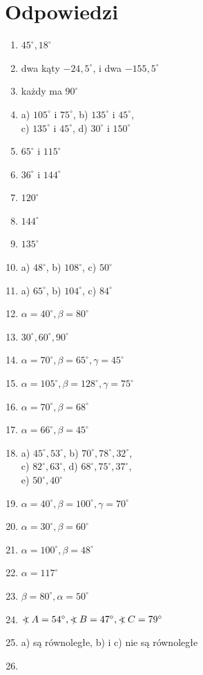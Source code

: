 \documentclass[10pt]{article}
\newcommand\Varangle{\mathop{{<\!\!\!\!\!\text{\small)}}\:}\nolimits}
\begin{document}
\section*{Odpowiedzi}
\begin{enumerate}
  \item \(45^{\circ}, 18^{\circ}\)
  \item dwa kąty \(-24,5^{\circ}\), i dwa \(-155,5^{\circ}\)
  \item każdy ma \(90^{\circ}\)
  \item a) \(105^{\circ}\) i \(75^{\circ}\), b) \(135^{\circ}\) i \(45^{\circ}\),\\
c) \(135^{\circ}\) i \(45^{\circ}\), d) \(30^{\circ}\) i \(150^{\circ}\)
  \item \(65^{\circ}\) i \(115^{\circ}\)
  \item \(36^{\circ}\) i \(144^{\circ}\)
  \item \(120^{\circ}\)
  \item \(144^{\circ}\)
  \item \(135^{\circ}\)
  \item a) \(48^{\circ}\), b) \(108^{\circ}\), c) \(50^{\circ}\)
  \item a) \(65^{\circ}\), b) \(104^{\circ}\), c) \(84^{\circ}\)
  \item \(\alpha=40^{\circ}, \beta=80^{\circ}\)
  \item \(30^{\circ}, 60^{\circ}, 90^{\circ}\)
  \item \(\alpha=70^{\circ}, \beta=65^{\circ}, \gamma=45^{\circ}\)
  \item \(\alpha=105^{\circ}, \beta=128^{\circ}, \gamma=75^{\circ}\)
  \item \(\alpha=70^{\circ}, \beta=68^{\circ}\)
  \item \(\alpha=66^{\circ}, \beta=45^{\circ}\)
  \item a) \(45^{\circ}, 53^{\circ}\), b) \(70^{\circ}, 78^{\circ}, 32^{\circ}\),\\
c) \(82^{\circ}, 63^{\circ}\), d) \(68^{\circ}, 75^{\circ}, 37^{\circ}\),\\
e) \(50^{\circ}, 40^{\circ}\)
  \item \(\alpha=40^{\circ}, \beta=100^{\circ}, \gamma=70^{\circ}\)
  \item \(\alpha=30^{\circ}, \beta=60^{\circ}\)
  \item \(\alpha=100^{\circ}, \beta=48^{\circ}\)
  \item \(\alpha=117^{\circ}\)
  \item \(\beta=80^{\circ}, \alpha=50^{\circ}\)
  \item \(\Varangle A=54^{\circ}, \Varangle B=47^{\circ}, \Varangle C=79^{\circ}\)
  \item a) są równoległe, b) i c) nie są równoległe
  \item 
\end{enumerate}
\end{document}
